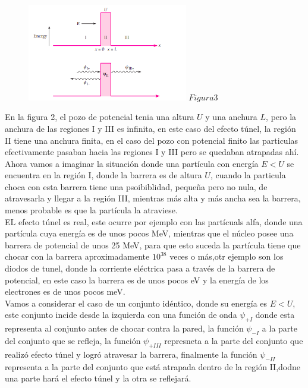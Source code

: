 \documentclass[a4paper]{article}
\begin{document}
            \saltoPag

            \begin{figure}[h!]
                \centering
                \includegraphics[width=7cm]{../../imagenes/efecto_tunel.png}
                \vspace{-0.5mm}
                \textbf{$Figura 3$}
            \end{figure}

            \indent En la figura 2, el pozo de potencial tenia una altura $U$ y una anchura $L$, pero la anchura de las regiones I y III es infinita, en este caso del efecto túnel, la región II tiene una anchura finita, en el caso del pozo con potencial finito las particulas efectivamente pasaban hacia las regiones I y III pero se quedaban atrapadas ahí.\\
            \indent Ahora vamos a imaginar la situación donde una partícula con energía $E < U$ se encuentra en la región I, donde la barrera es de altura $U$, cuando la particula choca con esta barrera tiene una psoibiblidad, pequeña pero no nula, de atravesarla y llegar a la región III, mientras más alta y más ancha sea la barrera, menos probable es que la partícula la atraviese.\\
            \indent EL efecto túnel es real, este ocurre por ejemplo con las partícuals alfa, donde una partícula cuya energía es de unos pocos MeV, mientras que el núcleo posee una barrera de potencial de unos 25 MeV, para que esto suceda la partícula tiene que chocar con la barrera aproximadamente $10^{38}$ veces o más,otr ejemplo son los diodos de tunel, donde la corriente eléctrica pasa a través de la barrera de potencial, en este caso la barrera es de unos pocos eV y la energía de los electrones es de unos pocos meV.\\
            \indent Vamos a considerar el caso de un conjunto idéntico, donde su energía es $E < U$, este conjunto incide desde la izquierda con una función de onda $\psi_{+I}$ donde esta representa al conjunto antes de chocar contra la pared, la función $\psi_{-I}$ a la parte del conjunto que se refleja, la función $\psi_{+III}$ represneta a la parte del conjunto que realizó efecto túnel y logró atravesar la barrera, finalmente la función $\psi_{-II}$ representa a la parte del conjunto que está atrapada dentro de la región II,dodne una parte hará el efecto túnel y la otra se reflejará.\\
\end{document}
